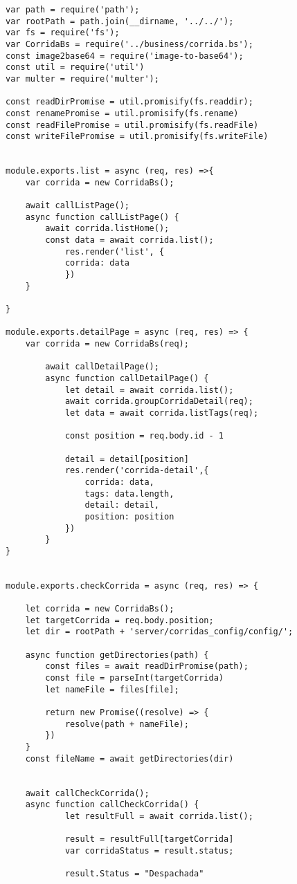 \begin{lstlisting}[caption=Exemplo do código dos \textit{controllers}]
var path = require('path');
var rootPath = path.join(__dirname, '../../');
var fs = require('fs');
var CorridaBs = require('../business/corrida.bs');
const image2base64 = require('image-to-base64');
const util = require('util')
var multer = require('multer');

const readDirPromise = util.promisify(fs.readdir);
const renamePromise = util.promisify(fs.rename)
const readFilePromise = util.promisify(fs.readFile)
const writeFilePromise = util.promisify(fs.writeFile)


module.exports.list = async (req, res) =>{
	var corrida = new CorridaBs();

	await callListPage();
	async function callListPage() {
		await corrida.listHome();
		const data = await corrida.list();
			res.render('list', {
			corrida: data
			})
	}

}	

module.exports.detailPage = async (req, res) => { 
	var corrida = new CorridaBs(req);

		await callDetailPage();
		async function callDetailPage() {
			let detail = await corrida.list();
			await corrida.groupCorridaDetail(req);
			let data = await corrida.listTags(req);
			
			const position = req.body.id - 1

			detail = detail[position]
			res.render('corrida-detail',{
				corrida: data,
				tags: data.length,
				detail: detail,
				position: position
			})
		}
}


module.exports.checkCorrida = async (req, res) => {
	
	let corrida = new CorridaBs();
	let targetCorrida = req.body.position;
	let dir = rootPath + 'server/corridas_config/config/';

	async function getDirectories(path) {
		const files = await readDirPromise(path);
		const file = parseInt(targetCorrida) 
		let nameFile = files[file];

		return new Promise((resolve) => {
			resolve(path + nameFile);
		})
	}
	const fileName = await getDirectories(dir)

	
	await callCheckCorrida();
	async function callCheckCorrida() {
			let resultFull = await corrida.list();

			result = resultFull[targetCorrida]
			var corridaStatus = result.status;
		
			result.Status = "Despachada"


\end{lstlisting}
